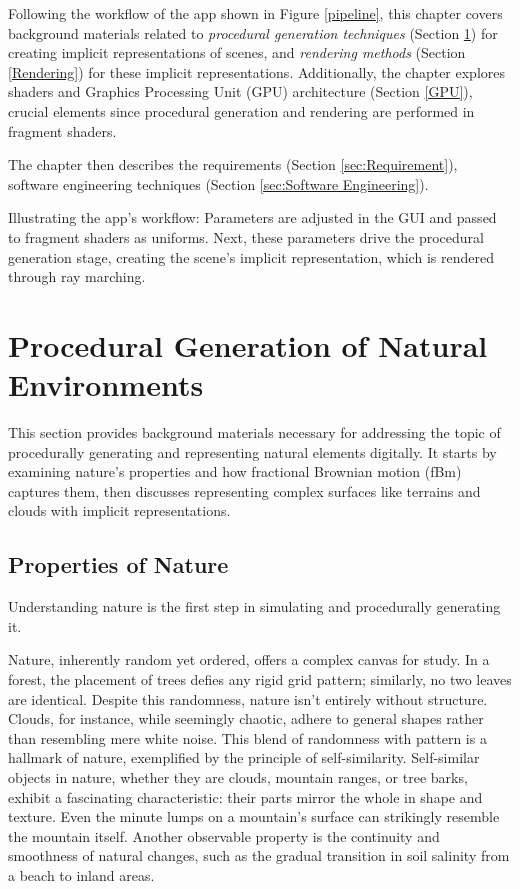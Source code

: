 \label{sec:Preparation}

Following the workflow of the app shown in Figure \ref{pipeline}, this chapter covers background materials related to \textit{procedural generation techniques} (Section \ref{Procedural Generation}) for creating implicit representations of scenes, and \textit{rendering methods} (Section \ref{Rendering}) for these implicit representations. Additionally, the chapter explores shaders and Graphics Processing Unit (GPU) architecture (Section \ref{GPU}), crucial elements since procedural generation and rendering are performed in fragment shaders.

The chapter then describes the requirements (Section \ref{sec:Requirement}), software engineering techniques (Section \ref{sec:Software Engineering}).


{
Illustrating the app's workflow: Parameters are adjusted in the GUI and passed to fragment shaders as uniforms. Next, these parameters drive the procedural generation stage, creating the scene's implicit representation, which is rendered through ray marching.}


\section{Procedural Generation of Natural Environments}
\label{Procedural Generation}

This section provides background materials necessary for addressing the topic of procedurally generating and representing natural elements digitally. It starts by examining nature's properties and how fractional Brownian motion (fBm) captures them, then discusses representing complex surfaces like terrains and clouds with implicit representations.

\subsection{Properties of Nature}
\label{Properties of Nature}

Understanding nature is the first step in simulating and procedurally generating it.

Nature, inherently random yet ordered, offers a complex canvas for study. In a forest, the placement of trees defies any rigid grid pattern; similarly, no two leaves are identical. Despite this randomness, nature isn't entirely without structure. Clouds, for instance, while seemingly chaotic, adhere to general shapes rather than resembling mere white noise. This blend of randomness with pattern is a hallmark of nature, exemplified by the principle of self-similarity. Self-similar objects in nature, whether they are clouds, mountain ranges, or tree barks, exhibit a fascinating characteristic: their parts mirror the whole in shape and texture. Even the minute lumps on a mountain's surface can strikingly resemble the mountain itself. Another observable property is the continuity and smoothness of natural changes, such as the gradual transition in soil salinity from a beach to inland areas.

